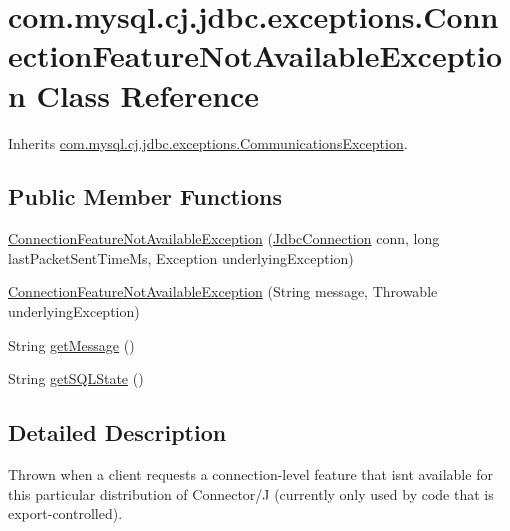 \hypertarget{classcom_1_1mysql_1_1cj_1_1jdbc_1_1exceptions_1_1_connection_feature_not_available_exception}{}\section{com.\+mysql.\+cj.\+jdbc.\+exceptions.\+Connection\+Feature\+Not\+Available\+Exception Class Reference}
\label{classcom_1_1mysql_1_1cj_1_1jdbc_1_1exceptions_1_1_connection_feature_not_available_exception}


Inherits \mbox{\hyperlink{classcom_1_1mysql_1_1cj_1_1jdbc_1_1exceptions_1_1_communications_exception}{com.\+mysql.\+cj.\+jdbc.\+exceptions.\+Communications\+Exception}}.

\subsection*{Public Member Functions}
\begin{DoxyCompactItemize}
\item 
\mbox{\hyperlink{classcom_1_1mysql_1_1cj_1_1jdbc_1_1exceptions_1_1_connection_feature_not_available_exception_aa1d0a3f13ee9d6837d7183244ee76058}{Connection\+Feature\+Not\+Available\+Exception}} (\mbox{\hyperlink{interfacecom_1_1mysql_1_1cj_1_1jdbc_1_1_jdbc_connection}{Jdbc\+Connection}} conn, long last\+Packet\+Sent\+Time\+Ms, Exception underlying\+Exception)
\item 
\mbox{\hyperlink{classcom_1_1mysql_1_1cj_1_1jdbc_1_1exceptions_1_1_connection_feature_not_available_exception_a2a8ec127394d86b606a63d19badde154}{Connection\+Feature\+Not\+Available\+Exception}} (String message, Throwable underlying\+Exception)
\item 
String \mbox{\hyperlink{classcom_1_1mysql_1_1cj_1_1jdbc_1_1exceptions_1_1_connection_feature_not_available_exception_a27d6774599a3620d41fc3b9684cc5cc7}{get\+Message}} ()
\item 
String \mbox{\hyperlink{classcom_1_1mysql_1_1cj_1_1jdbc_1_1exceptions_1_1_connection_feature_not_available_exception_ad35b6c8b062fc83e7b85ea7cec09880e}{get\+S\+Q\+L\+State}} ()
\end{DoxyCompactItemize}


\subsection{Detailed Description}
Thrown when a client requests a connection-\/level feature that isn\textquotesingle{}t available for this particular distribution of Connector/J (currently only used by code that is export-\/controlled). 

